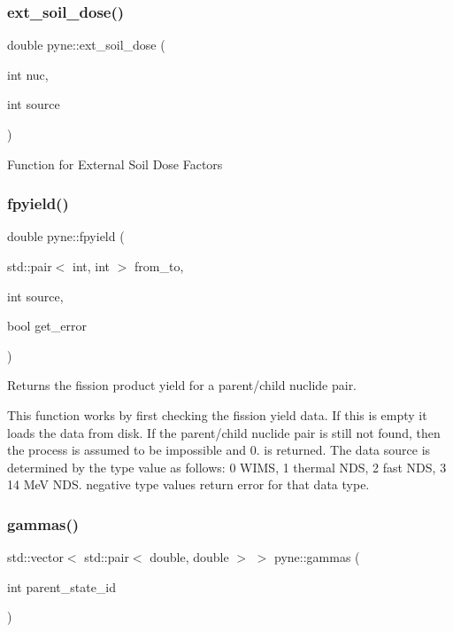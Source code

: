 \subsubsection{\texorpdfstring{ext\+\_\+soil\+\_\+dose()}{ext\_soil\_dose()}}
{\footnotesize\ttfamily double pyne\+::ext\+\_\+soil\+\_\+dose (\begin{DoxyParamCaption}\item[{int}]{nuc,  }\item[{int}]{source }\end{DoxyParamCaption})}

Function for External Soil Dose Factors \mbox{\label{namespacepyne_aff6ebb85fad0e8c4001fcfef4d334c8c}} 
\subsubsection{\texorpdfstring{fpyield()}{fpyield()}}
{\footnotesize\ttfamily double pyne\+::fpyield (\begin{DoxyParamCaption}\item[{std\+::pair$<$ int, int $>$}]{from\+\_\+to,  }\item[{int}]{source,  }\item[{bool}]{get\+\_\+error }\end{DoxyParamCaption})}



Returns the fission product yield for a parent/child nuclide pair. 

This function works by first checking the fission yield data. If this is empty it loads the data from disk. If the parent/child nuclide pair is still not found, then the process is assumed to be impossible and 0. is returned. The data source is determined by the type value as follows\+: 0 W\+I\+MS, 1 thermal N\+DS, 2 fast N\+DS, 3 14 MeV N\+DS. negative type values return error for that data type. \mbox{\label{namespacepyne_a8eeb397c67e950ae3b78c02a6a09655b}} 
\subsubsection{\texorpdfstring{gammas()}{gammas()}}
{\footnotesize\ttfamily std\+::vector$<$ std\+::pair$<$ double, double $>$ $>$ pyne\+::gammas (\begin{DoxyParamCaption}\item[{int}]{parent\+\_\+state\+\_\+id }\end{DoxyParamCaption})}



